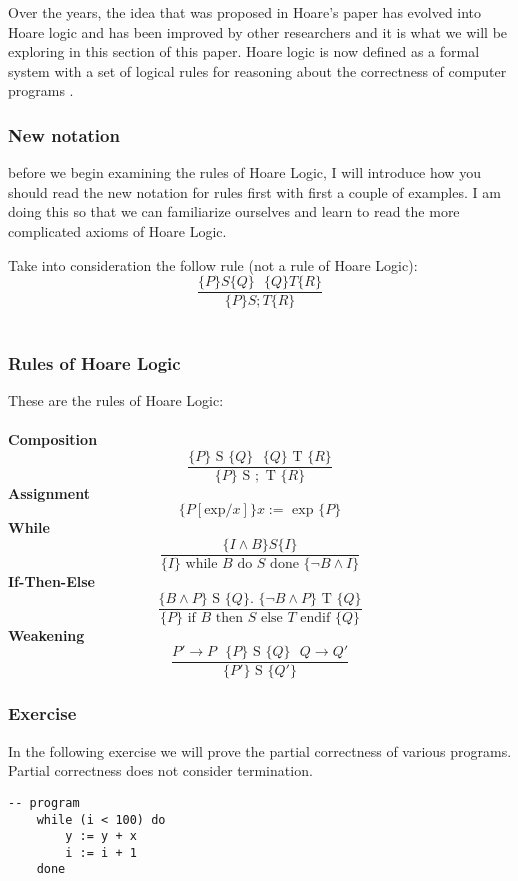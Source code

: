 \documentclass{article}
\begin{document}
\vspace{\baselineskip}
Over the years, the idea that was proposed in Hoare’s paper has evolved into Hoare logic and has been improved by other researchers and it is what we will be exploring in this section of this paper. Hoare logic is now defined as a formal system with a set of logical rules for reasoning about the correctness of computer programs \cite{PL}.

\subsubsection{New notation}
before we begin examining the rules of Hoare Logic, I will introduce how you should read the new notation for rules first with first a couple of examples. I am doing this so that we can familiarize ourselves and learn to read the more complicated axioms of Hoare Logic.

\vspace{\baselineskip}
Take into consideration the follow rule (not a rule of Hoare Logic):
$$ \frac{\{P\} S \{ Q\} \text{       } \{Q\} T \{R\}}{\{P\} S ;T \{R\}}$$
\\
\subsubsection{Rules of Hoare Logic}
These are the rules of Hoare Logic:\\
\vspace{\baselineskip}\\
\textbf{Composition}
$$ \frac{\{P\} \text{ S } \{ Q\} \text{       } \{Q\} \text{ T } \{R\}}{\{P\} \text{ S } ;\text{ T } \{R\}}$$
\textbf{Assignment}
$$ \{P[\text{exp} / x]\} x:=\text{ exp } \{P\}$$
\textbf{While}
$$ \frac{\{I\wedge B\} S \{ I\}}{\{ I\} \text{ while } B \text{ do } S \text{ done } \{ \neg B \wedge I\}}$$
\textbf{If-Then-Else}
$$ \frac{\{B \wedge P\} \text{ S } \{ Q\} \text{.    } \{\neg B\wedge P\} \text{ T } \{Q\}}{\{P\} \text{ if }B\text{ then }S\text{ else }T\text{ endif } \{Q\}}$$
\textbf{Weakening}
$$ \frac{P'\rightarrow P \text{    }\{P\} \text{ S }\{ Q\}\text{    } Q\rightarrow Q'}{\{P'\} \text{ S } \{Q'\}}$$

\subsubsection{Exercise}
In the following exercise we will prove the partial correctness of various programs. Partial correctness does not consider termination.
\begin{lstlisting}
-- program
    while (i < 100) do
        y := y + x
        i := i + 1
    done
\end{lstlisting}
\end{document}
